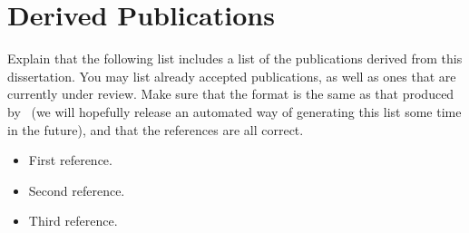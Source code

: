 
\chapter{Derived Publications}
\label{app:derived_publications}

Explain that the following list includes a list of the publications derived from this dissertation. You may list already accepted publications, as well as ones that are currently under review. Make sure that the format is the same as that produced by \BIBTeX\ (we will hopefully release an automated way of generating this list some time in the future), and that the references are all correct.

\begin{itemize}
	\item First reference.
	
	\item Second reference.
	
	\item Third reference.
\end{itemize}

